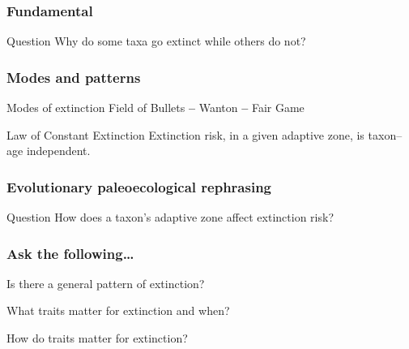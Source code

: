 \documentclass{beamer}
\begin{document}
\begin{frame}
  \frametitle{Fundamental}

  \begin{alertblock}{Question}
    Why do some taxa go extinct while others do not?
  \end{alertblock}
\end{frame}

\begin{frame} 
  \frametitle{Modes and patterns}

  \begin{block}{Modes of extinction \tiny{}}
     Field of Bullets 
     \textbf{--} 
     Wanton 
     \textbf{--} 
     Fair Game 
  \end{block}

  \vspace{1cm}

  \begin{block}{Law of Constant Extinction \tiny{}}
    Extinction risk, in a given adaptive zone, is taxon--age independent.
  \end{block}
\end{frame}

\begin{frame}
  \frametitle{Evolutionary paleoecological rephrasing}

  \begin{block}{Question}
    How does a taxon's adaptive zone affect extinction risk?
  \end{block}
\end{frame}

\begin{frame}
  \frametitle{Ask the following\dots}

  \begin{center}
    Is there a \alert{general pattern} of extinction?

    \vspace{0.75cm}

    \alert{What} traits matter for extinction and \alert{when}?

    \vspace{0.75cm}

    \alert{How} do traits matter for extinction?
  \end{center}
\end{frame}
\end{document}
